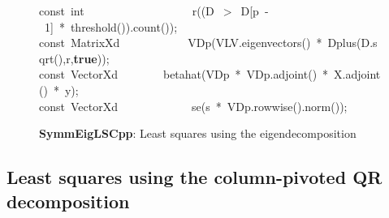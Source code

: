 \documentclass[shortnames,article]{jss}
\newcommand{\hlstd}[1]{\textcolor[rgb]{0,0,0}{#1}}
\newcommand{\hlnum}[1]{\textcolor[rgb]{0,0,0}{#1}}
\newcommand{\hlopt}[1]{\textcolor[rgb]{0,0,0}{#1}}
\newcommand{\hlkwa}[1]{\textcolor[rgb]{0.61,0.13,0.93}{\bf{#1}}}
\newcommand{\hlkwb}[1]{\textcolor[rgb]{0.13,0.54,0.13}{#1}}
\newcommand{\hlkwd}[1]{\textcolor[rgb]{0,0,0}{#1}}
\begin{document}
\begin{figure}[htb]
    \hlstd{}\hlkwb{const\ int}\hlstd{\ \ \ \ \ \ \ \ \ \ \ \ \ \ \ \ \ \ \ }\hlkwb{}\hlstd{}\hlkwd{r}\hlstd{}\hlopt{((}\hlstd{D\ }\hlopt{$>$\ }\hlstd{D}\hlopt{{[}}\hlstd{p\ }\hlopt{{-}\ }\hlstd{}\hlnum{1}\hlstd{}\hlopt{{]}\ {*}\ }\hlstd{}\hlkwd{threshold}\hlstd{}\hlopt{()).}\hlstd{}\hlkwd{count}\hlstd{}\hlopt{());}\hspace*{\fill}\\
    \hlstd{}\hlkwb{const\ }\hlstd{MatrixXd}\hlstd{\ \ \ \ \ \ \ \ \ \ \ \ }\hlstd{}\hlkwd{VDp}\hlstd{}\hlopt{(}\hlstd{VLV}\hlopt{.}\hlstd{}\hlkwd{eigenvectors}\hlstd{}\hlopt{()\ {*}\ }\hlstd{}\hlkwd{Dplus}\hlstd{}\hlopt{(}\hlstd{D}\hlopt{.}\hlstd{}\hlkwd{sqrt}\hlstd{}\hlopt{(),}\hlstd{r}\hlopt{,}\hlstd{}\hlkwa{true}\hlstd{}\hlopt{));}\hspace*{\fill}\\
    \hlstd{}\hlkwb{const\ }\hlstd{VectorXd}\hlstd{\ \ \ \ \ \ \ \ }\hlstd{}\hlkwd{betahat}\hlstd{}\hlopt{(}\hlstd{VDp\ }\hlopt{{*}\ }\hlstd{VDp}\hlopt{.}\hlstd{}\hlkwd{adjoint}\hlstd{}\hlopt{()\ {*}\ }\hlstd{X}\hlopt{.}\hlstd{}\hlkwd{adjoint}\hlstd{}\hlopt{()\ {*}\ }\hlstd{y}\hlopt{);}\hspace*{\fill}\\
    \hlstd{}\hlkwb{const\ }\hlstd{VectorXd}\hlstd{\ \ \ \ \ \ \ \ \ \ \ \ \ }\hlstd{}\hlkwd{se}\hlstd{}\hlopt{(}\hlstd{s\ }\hlopt{{*}\ }\hlstd{VDp}\hlopt{.}\hlstd{}\hlkwd{rowwise}\hlstd{}\hlopt{().}\hlstd{}\hlkwd{norm}\hlstd{}\hlopt{());}\hlstd{}\hspace*{\fill}
    \normalfont
    \normalsize
  \caption{\textbf{SymmEigLSCpp}: Least squares using the eigendecomposition}
  \label{SymmEigLS}
\end{figure}


\subsection{Least squares using the column-pivoted QR decomposition}
\label{sec:colPivQR}
\end{document}
